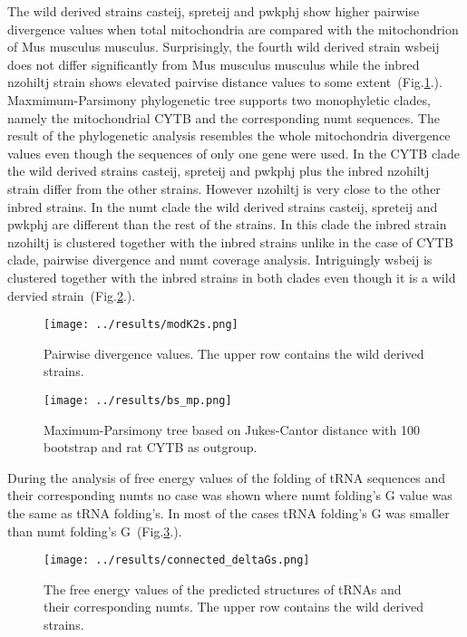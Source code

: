 \documentclass[a4paper,12pt]{article}
\numberwithin{equation}{section} %
\begin{document}
\indent The wild derived strains casteij, spreteij and pwkphj show higher pairwise divergence values when total mitochondria are compared with the mitochondrion of Mus musculus musculus. Surprisingly, the fourth wild derived strain wsbeij does not differ significantly from Mus musculus musculus while the inbred nzohiltj strain shows elevated pairvise distance values to some extent~(Fig.\ref{fig:modK2s}.). \\ \indent Maxmimum-Parsimony phylogenetic tree supports two monophyletic clades, namely the mitochondrial CYTB and the corresponding numt sequences. The result of the phylogenetic analysis resembles the whole mitochondria divergence values even though the sequences of only one gene were used. In the CYTB clade the wild derived strains casteij, spreteij and pwkphj plus the inbred nzohiltj strain differ from the other strains. However nzohiltj is very close to the other inbred strains. In the numt clade the wild derived strains casteij, spreteij and pwkphj are different than the rest of the strains. In this clade the inbred strain nzohiltj is clustered together with the inbred strains unlike in the case of CYTB clade, pairwise divergence and numt coverage analysis. Intriguingly wsbeij is clustered together with the inbred strains in both clades even though it is a wild dervied strain~(Fig.\ref{fig:bs_mp}.).
\begin{figure}[H]
    \centering
    \captionsetup{justification=centering}
    \texttt{[image: ../results/modK2s.png]}
    \caption{Pairwise divergence values. The upper row contains the wild derived strains.}
    \label{fig:modK2s}
\end{figure}

\begin{figure}[H]
    \centering
    \captionsetup{justification=centering}
    \texttt{[image: ../results/bs\_mp.png]}
    \caption{Maximum-Parsimony tree based on Jukes-Cantor distance with 100 bootstrap and rat CYTB as outgroup.}
    \label{fig:bs_mp}
\end{figure}

\indent During the analysis of free energy values of the folding of tRNA sequences and their corresponding numts no case was shown where numt folding's \Delta G value was the same as tRNA folding's. In most of the cases tRNA folding's \Delta G was smaller than numt folding's \Delta G~(Fig.\ref{fig:deltaGs}.).
\begin{figure}[H]
    \centering
    \captionsetup{justification=centering}
    \texttt{[image: ../results/connected\_deltaGs.png]}
    \caption{The free energy values of the predicted structures  of tRNAs and their corresponding numts. The upper row contains the wild derived strains.}
    \label{fig:deltaGs}
\end{figure}
\end{document}
